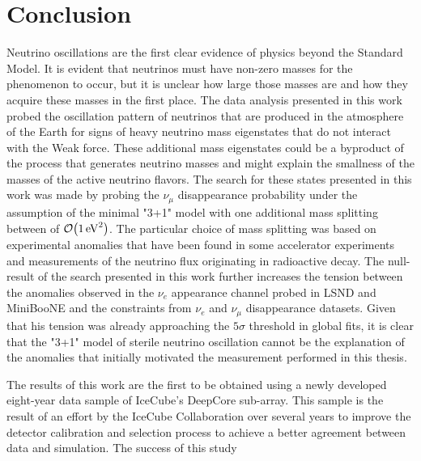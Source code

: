 \chapter{Conclusion}

Neutrino oscillations are the first clear evidence of physics beyond the Standard Model. It is evident that neutrinos must have non-zero masses for the phenomenon to occur, but it is unclear how large those masses are and how they acquire these masses in the first place. The data analysis presented in this work probed the oscillation pattern of neutrinos that are produced in the atmosphere of the Earth for signs of heavy neutrino mass eigenstates that do not interact with the Weak force. These additional mass eigenstates could be a byproduct of the process that generates neutrino masses and might explain the smallness of the masses of the active neutrino flavors. The search for these states presented in this work was made by probing the $\nu_\mu$ disappearance probability under the assumption of the minimal "3+1" model with one additional mass splitting between of $\order{\SI{1}{\electronvolt\squared}}$. The particular choice of mass splitting was based on experimental anomalies that have been found in some accelerator experiments and measurements of the neutrino flux originating in radioactive decay. The null-result of the search presented in this work further increases the tension between the anomalies observed in the $\nu_e$ appearance channel probed in LSND and MiniBooNE and the constraints from $\nu_e$ and $\nu_\mu$ disappearance datasets. Given that his tension was already approaching the $5\sigma$ threshold in global fits, it is clear that the "3+1" model of sterile neutrino oscillation cannot be the explanation of the anomalies that initially motivated the measurement performed in this thesis.

The results of this work are the first to be obtained using a newly developed eight-year data sample of IceCube's DeepCore sub-array. This sample is the result of an effort by the IceCube Collaboration over several years to improve the detector calibration and selection process to achieve a better agreement between data and simulation. The success of this study
